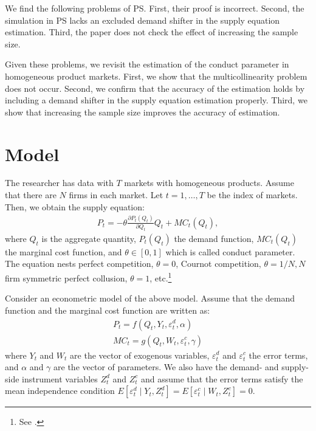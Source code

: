 \documentclass[11pt, a4paper]{article}
\begin{document}
We find the following problems of PS. 
First, their proof is incorrect. 
Second, the simulation in PS lacks an excluded demand shifter in the supply equation estimation. 
Third, the paper does not check the effect of increasing the sample size. 

Given these problems, we revisit the estimation of the conduct parameter in homogeneous product markets.
First, we show that the multicollinearity problem does not occur.
Second, we confirm that the accuracy of the estimation holds by including a demand shifter in the supply equation estimation properly. 
Third, we show that increasing the sample size improves the accuracy of estimation.

\section{Model}
The researcher has data with $T$ markets with homogeneous products.
Assume that there are $N$ firms in each market.
Let $t = 1,\ldots, T$ be the index of markets.
Then, we obtain the supply equation:
\begin{align}
     P_t = -\theta\frac{\partial P_t(Q_{t})}{\partial Q_{t}}Q_{t} + MC_t(Q_{t}),\label{eq:supply_equation}
\end{align}
where $Q_{t}$ is the aggregate quantity, $P_t(Q_{t})$ the demand function, $MC_{t}(Q_{t})$ the marginal cost function, and $\theta\in[0,1]$ which is called conduct parameter. 
The equation nests perfect competition, $\theta=0$, Cournot competition, $\theta=1/N, N$ firm symmetric perfect collusion, $\theta=1$, etc.\footnote{See \cite{bresnahan1982oligopoly}.} 

Consider an econometric model of the above model.
Assume that the demand function and the marginal cost function are written as: 
\begin{align}
    P_t = f(Q_{t}, Y_t, \varepsilon^{d}_{t}, \alpha) \label{eq:demand}\\
    MC_t = g(Q_{t}, W_{t}, \varepsilon^{c}_{t}, \gamma)\label{eq:marginal_cost}
\end{align}
where $Y_t$ and $W_{t}$ are the vector of exogenous variables, $\varepsilon^{d}_{t}$ and $\varepsilon^{c}_{t}$ the error terms, and $\alpha$ and $\gamma$ are the vector of parameters.
We also have the demand- and supply-side instrument variables $Z^{d}_{t}$ and $Z^{c}_{t}$ and assume that the error terms satisfy the mean independence condition $E[\varepsilon^{d}_{t}\mid Y_t, Z^{d}_{t}] = E[\varepsilon^{c}_{t} \mid W_{t}, Z^{c}_{t}] =0$.
\end{document}
